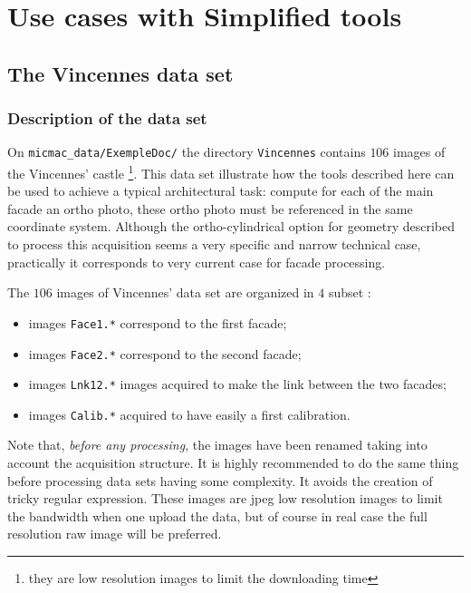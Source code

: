 \chapter{Use cases with Simplified tools}



\section{The Vincennes data set}


\subsection{Description of the data set}
\label{Vincennes:DataSet}

On {\tt micmac\_data/ExempleDoc/} the directory {\tt Vincennes} contains
$106$ images of the Vincennes' castle \footnote{they are low resolution images
to limit the  downloading time}. This data set illustrate how
the tools described here can be used to achieve a typical architectural task:
compute for each of the main facade an ortho photo, these ortho photo
must be referenced in the same coordinate system.  Although the ortho-cylindrical
option for geometry described to process this acquisition seems a very specific
and narrow technical case, practically it corresponds to very current case
for facade processing.


The $106$ images of Vincennes' data set are organized in $4$ subset :


\begin{itemize}
   \item  images {\tt Face1.*} correspond to the first facade;
   \item  images {\tt Face2.*} correspond to the second facade;
   \item  images {\tt  Lnk12.*} images acquired to make the link between
           the two facades;
   \item  images {\tt  Calib.*} acquired to have easily a first
           calibration.
\end{itemize}

Note that, \emph{before any processing}, the images have been renamed taking
into account the acquisition structure. It is highly recommended to do the
same thing before processing data sets having some complexity. It avoids
the creation of tricky regular expression. These images are jpeg low resolution
images to limit the bandwidth when one upload the data, but of course in
real case the full resolution raw image will be preferred.


